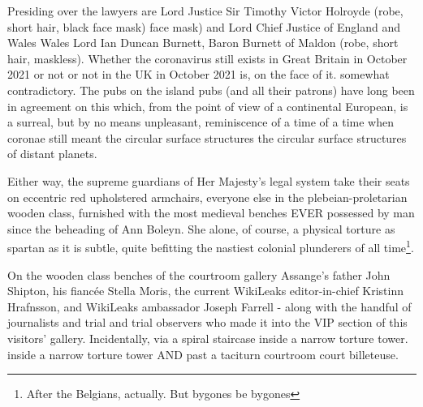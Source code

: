 \begin{multicols}{2}
Presiding over the lawyers are Lord Justice Sir
Timothy Victor Holroyde (robe, short hair, black face mask)
face mask) and Lord Chief Justice of England and Wales
Wales Lord Ian Duncan Burnett, Baron Burnett of Maldon (robe, short hair, maskless). Whether the coronavirus
still exists in Great Britain in October 2021 or not
or not in the UK in October 2021 is, on the face of it.
somewhat contradictory. The pubs on the island
pubs (and all their patrons) have long been in agreement on this
which, from the point of view of a continental European, is a
surreal, but by no means unpleasant, reminiscence of a time
of a time when coronae still meant the circular surface structures
the circular surface structures of distant planets.

Either way, the supreme guardians of Her Majesty's legal system take their seats on eccentric red upholstered armchairs, everyone else in the plebeian-proletarian
wooden class, furnished with the most medieval benches EVER possessed by man since the beheading of Ann Boleyn. She alone, of course, a physical torture as spartan as it is subtle,
quite befitting the nastiest colonial plunderers of all time\footnote[8]{After the Belgians, actually. But bygones be bygones}.

On the wooden class benches of the courtroom gallery
Assange's father John Shipton, his fiancée Stella Moris, the current WikiLeaks editor-in-chief Kristinn Hrafnsson, and WikiLeaks ambassador
Joseph Farrell - along with the handful of journalists and trial
and trial observers who made it into the VIP section of this
visitors' gallery. Incidentally, via a
spiral staircase inside a narrow torture tower.
inside a narrow torture tower AND past a taciturn courtroom
court billeteuse.



\end{multicols}
